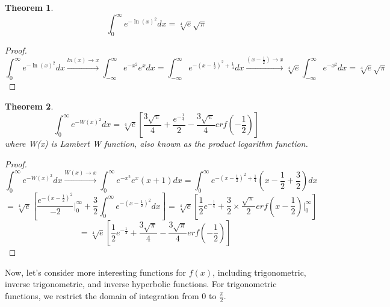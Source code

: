 \documentclass[a4paper,twoside,10pt]{article}
\newtheorem{theorem}{Theorem}[section]
\begin{document}
\begin{theorem}
\begin{equation}
\int_0^{\infty} e^{-\ln(x)^2} dx = \sqrt[4]{e} \sqrt{\pi}
\end{equation}
\end{theorem}
\begin{proof}
\[ \int_0^{\infty} e^{-\ln(x)^2} dx \xrightarrow{ln(x)\rightarrow x } \int_{-\infty}^{\infty} e^{-x^2} e^x  dx = \int_{-\infty}^{\infty} e^{-(x-\frac{1}{2})^2+\frac{1}{4}} dx  \xrightarrow{(x-\frac{1}{2}) \rightarrow x} \sqrt[4]{e} \int_{-\infty}^{\infty}e^{-x^2} dx = \sqrt[4]{e} \sqrt{\pi}  \,\,   \]
\end{proof}


\begin{theorem}
\begin{equation}
 \int_0^{\infty} e^{-W(x)^2} dx = \sqrt[4]{e} \left[\frac{3\sqrt{\pi}}{4}+\frac{e^{-\frac{1}{4}}}{2}-\frac{3\sqrt{\pi}}{4}erf\left(-\frac{1}{2}\right)  \right]   
\end{equation}
where W(x) is Lambert W function, also known as the product logarithm function.
\end{theorem}
\begin{proof}
\[ \int_0^{\infty} e^{-W(x)^2} dx \xrightarrow{W(x)\rightarrow x } \int_{0}^{\infty} e^{-x^2} e^x(x+1)  dx = \int_{0}^{\infty} e^{-(x-\frac{1}{2})^2+\frac{1}{4}} (x-\frac{1}{2}+\frac{3}{2}) dx  \]
\[=\sqrt[4]{e} \left[ \frac{e^{-(x-\frac{1}{2})^2}}{-2} \Big|_0^{\infty} + \frac{3}{2} \int_0^{\infty} e^{-(x-\frac{1}{2})^2} dx  \right] = \sqrt[4]{e} \left[\frac{1}{2}e^{-\frac{1}{4}} + \frac{3}{2}\times \frac{\sqrt{\pi}}{2} erf(x-\frac{1}{2})\Big|_0^{\infty}   \right] \]
\[ = \sqrt[4]{e} \left[\frac{1}{2}e^{-\frac{1}{4}} + \frac{3\sqrt{\pi}}{4}-\frac{3\sqrt{\pi}}{4}erf(-\frac{1}{2}) \right] \,\,   \]
\end{proof}

Now,  let's consider more interesting functions for $f(x)$, including trigonometric, inverse trigonometric, and inverse hyperbolic functions. For trigonometric functions, we restrict the domain of integration from 0 to   $\frac{\pi}{2}  $. 
\end{document}
